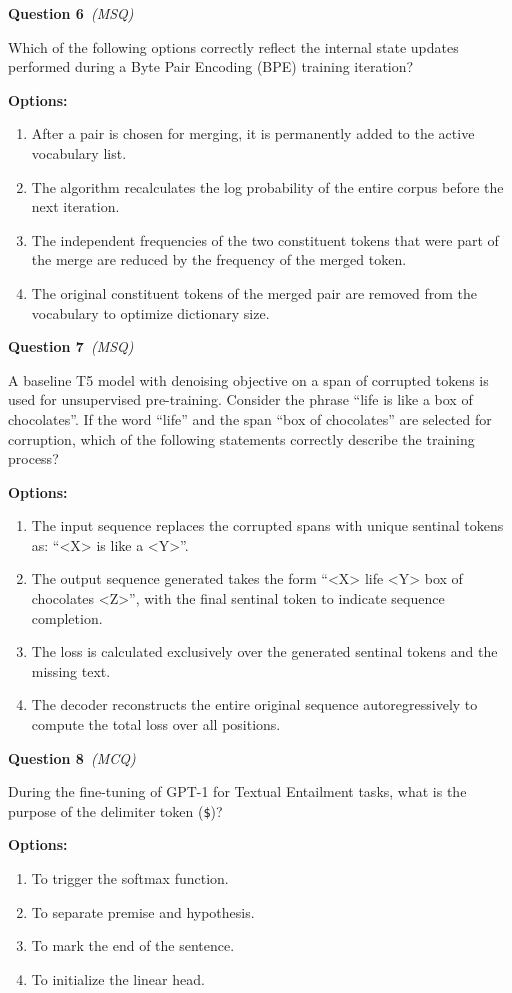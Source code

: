 \documentclass[11pt]{article}
\newcommand{\q}[2]{\vspace{0.5em}\noindent\textbf{Question #1}\if\relax\detokenize{#2}\relax\else\ \textit{(#2)}\fi\par}
\newcommand{\opts}{\textbf{Options:}}
\begin{document}
\q{6}{MSQ}
Which of the following options correctly reflect the internal state updates performed during a Byte Pair Encoding (BPE) training iteration?

\opts
\begin{enumerate}[label=(\alph*)]
\item After a pair is chosen for merging, it is permanently added to the active vocabulary list.
\item The algorithm recalculates the log probability of the entire corpus before the next iteration.
\item The independent frequencies of the two constituent tokens that were part of the merge are reduced by the frequency of the merged token.
\item The original constituent tokens of the merged pair are removed from the vocabulary to optimize dictionary size.
\end{enumerate}

\q{7}{MSQ}
A baseline T5 model with denoising objective on a span of corrupted tokens is used for unsupervised pre-training. Consider the phrase ``life is like a box of chocolates''. If the word ``life'' and the span ``box of chocolates'' are selected for corruption, which of the following statements correctly describe the training process?

\opts
\begin{enumerate}[label=(\alph*)]
\item The input sequence replaces the corrupted spans with unique sentinal tokens as: ``<X> is like a <Y>''.
\item The output sequence generated takes the form ``<X> life <Y> box of chocolates <Z>'', with the final sentinal token to indicate sequence completion.
\item The loss is calculated exclusively over the generated sentinal tokens and the missing text.
\item The decoder reconstructs the entire original sequence autoregressively to compute the total loss over all positions.
\end{enumerate}

\q{8}{MCQ}
During the fine-tuning of GPT-1 for Textual Entailment tasks, what is the purpose of the delimiter token (\texttt{\$})?

\opts
\begin{enumerate}[label=(\alph*)]
\item To trigger the softmax function.
\item To separate premise and hypothesis.
\item To mark the end of the sentence.
\item To initialize the linear head.
\end{enumerate}
\end{document}
